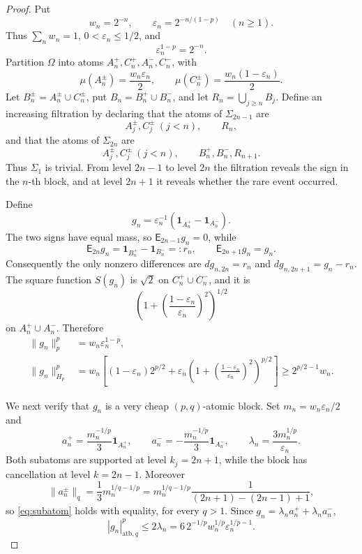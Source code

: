 \documentclass[11pt]{article}
\newcommand{\E}{\mathsf E}
\newcommand{\1}{\mathbf 1}
\begin{document}
\begin{proof}
Put
\[
 w_n=2^{-n},\qquad
 \varepsilon_n=2^{-n/(1-p)} \quad(n\geq1).
\]
Thus \(\sum_nw_n=1\), \(0<\varepsilon_n\leq1/2\), and
\begin{equation}\label{eq:epssum}
 \varepsilon_n^{1-p}=2^{-n}.
\end{equation}
Partition \(\Omega\) into atoms
\(A_n^+,C_n^+,A_n^-,C_n^-\), with
\[
 \mu(A_n^\pm)=\frac{w_n\varepsilon_n}{2},
 \qquad
 \mu(C_n^\pm)=\frac{w_n(1-\varepsilon_n)}{2}.
\]
Let \(B_n^\pm=A_n^\pm\cup C_n^\pm\), put
\(B_n=B_n^+\cup B_n^-\), and let
\(R_n=\bigcup_{j\geq n}B_j\).  Define an increasing filtration by declaring
that the atoms of \(\Sigma_{2n-1}\) are
\[
 A_j^\pm,C_j^\pm\ (j<n),\qquad R_n,
\]
and that the atoms of \(\Sigma_{2n}\) are
\[
 A_j^\pm,C_j^\pm\ (j<n),\qquad B_n^+,B_n^-,R_{n+1}.
\]
Thus \(\Sigma_1\) is trivial.  From level \(2n-1\) to level \(2n\) the
filtration reveals the sign in the \(n\)-th block, and at level \(2n+1\) it
reveals whether the rare event occurred.

Define
\begin{equation}\label{eq:gn}
 g_n=\varepsilon_n^{-1}(\1_{A_n^+}-\1_{A_n^-}).
\end{equation}
The two signs have equal mass, so \(\E_{2n-1}g_n=0\), while
\[
 \E_{2n}g_n=\1_{B_n^+}-\1_{B_n^-}=:r_n,
 \qquad \E_{2n+1}g_n=g_n.
\]
Consequently the only nonzero differences are
\(dg_{n,2n}=r_n\) and \(dg_{n,2n+1}=g_n-r_n\).  The square
function \(S(g_n)\) is \(\sqrt2\) on \(C_n^+\cup C_n^-\), and it is
\[
 \left(1+\left(\frac{1-\varepsilon_n}{\varepsilon_n}\right)^2\right)^{1/2}
\]
on \(A_n^+\cup A_n^-\).  Therefore
\begin{align}
 \|g_n\|_p^p
   &=w_n\varepsilon_n^{1-p},\label{eq:lpgn}\\
 \|g_n\|_{H_p}^p
   &=w_n\left[(1-\varepsilon_n)2^{p/2}
      +\varepsilon_n
       \left(1+\left(\frac{1-\varepsilon_n}{\varepsilon_n}\right)^2
       \right)^{p/2}\right]
   \geq 2^{p/2-1}w_n.\label{eq:hpgn}
\end{align}

We next verify that \(g_n\) is a very cheap \((p,q)\)-atomic block.  Set
\(m_n=w_n\varepsilon_n/2\) and
\[
 a_n^+=\frac{m_n^{-1/p}}3\1_{A_n^+},
 \qquad
 a_n^-=-\frac{m_n^{-1/p}}3\1_{A_n^-},
 \qquad
 \lambda_n=\frac{3m_n^{1/p}}{\varepsilon_n}.
\]
Both subatoms are supported at level \(k_j=2n+1\), while the block has
cancellation at level \(k=2n-1\).  Moreover
\[
 \|a_n^\pm\|_q
 =\frac13m_n^{1/q-1/p}
 =m_n^{1/q-1/p}\frac1{(2n+1)-(2n-1)+1},
\]
so \eqref{eq:subatom} holds with equality, for every \(q>1\).  Since
\(g_n=\lambda_na_n^++\lambda_na_n^-\),
\begin{equation}\label{eq:blockgn}
 |g_n|_{\mathrm{atb},q}^p
 \leq2\lambda_n
 =6\,2^{-1/p}w_n^{1/p}\varepsilon_n^{1/p-1}.
\end{equation}


\end{proof}
\end{document}
